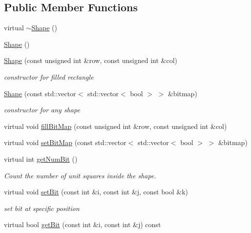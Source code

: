 \subsection*{Public Member Functions}
\begin{DoxyCompactItemize}
\item 
virtual \mbox{\hyperlink{class_shape_a935afc9e576015f967d90de56977167d}{$\sim$\+Shape}} ()
\item 
\mbox{\hyperlink{class_shape_aaa8d87171e65e0d8ba3c5459978992a7}{Shape}} ()
\item 
\mbox{\hyperlink{class_shape_adb7c908a72cc99aee8c23ff0d4c6173a}{Shape}} (const unsigned int \&row, const unsigned int \&col)
\begin{DoxyCompactList}\small\item\em constructor for filled rectangle \end{DoxyCompactList}\item 
\mbox{\hyperlink{class_shape_a9004eb6a22e2f005aed9aac83aa7377b}{Shape}} (const std\+::vector$<$ std\+::vector$<$ bool $>$ $>$ \&bitmap)
\begin{DoxyCompactList}\small\item\em constructor for any shape \end{DoxyCompactList}\item 
virtual void \mbox{\hyperlink{class_shape_a285a0848e8bc19b0e76e2661d63bb1a1}{fill\+Bit\+Map}} (const unsigned int \&row, const unsigned int \&col)
\item 
virtual void \mbox{\hyperlink{class_shape_ae79ee483d0f48a426d1a544fd22fd8e5}{set\+Bit\+Map}} (const std\+::vector$<$ std\+::vector$<$ bool $>$ $>$ \&bitmap)
\item 
virtual int \mbox{\hyperlink{class_shape_a87f7e888ab40590dd3e4f73e13514152}{get\+Num\+Bit}} ()
\begin{DoxyCompactList}\small\item\em Count the number of unit squares inside the shape. \end{DoxyCompactList}\item 
virtual void \mbox{\hyperlink{class_shape_af3b265335667167ced81b3226b07dcb0}{set\+Bit}} (const int \&i, const int \&j, const bool \&k)
\begin{DoxyCompactList}\small\item\em set bit at specific position \end{DoxyCompactList}\item 
virtual bool \mbox{\hyperlink{class_shape_ab486d732a49d49cbbc4fadf1f23c379e}{get\+Bit}} (const int \&i, const int \&j) const

\end{DoxyCompactItemize}

